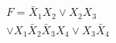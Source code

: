 \documentclass[preview]{standalone}
\begin{document}
\begin{align*}
F = \bar X_{1} X_{2} \lor X_{2} X_{3} \\ \lor X_{1} \bar X_{2} \bar X_{3} X_{4} \lor X_{3} \bar X_{4}
\end{align*}
\end{document}
